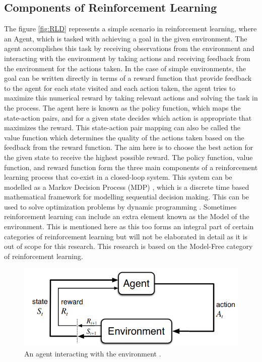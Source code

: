 \subsection{Components of Reinforcement Learning}

The figure \ref{fig:RLD} represents a simple scenario in reinforcement learning, where an Agent, which is tasked with achieving a goal in the given environment. The agent accomplishes this task by receiving observations from the environment and interacting with the environment by taking actions and receiving feedback from the environment for the actions taken. In the case of simple environments, the goal can be written directly in terms of a reward function that provide feedback to the agent for each state visited and each action taken, the agent tries to maximize this numerical reward by taking relevant actions and solving the task in the process. The agent here is known as the policy function, which maps the state-action pairs, and for a given state decides which action is appropriate that maximizes the reward. This state-action pair mapping can also be called the value function which determines the quality of the actions taken based on the feedback from the reward function. The aim here is to choose the best action for the given state to receive the highest possible reward. The policy function, value function, and reward function form the three main components of a reinforcement learning process that co-exist in a closed-loop system. This system can be modelled as a Markov Decision Process (MDP) \cite{Sutton1998} \cite{FMDP}, which is a discrete time based mathematical framework for modelling sequential decision making. This can be used to solve optimization problems by dynamic programming \cite{DPBE}. Sometimes reinforcement learning can include an extra element known as the Model of the environment. This is mentioned here as this too forms an integral part of certain categories of reinforcement learning but will not be elaborated in detail as it is out of scope for this research. This research is based on the Model-Free category of reinforcement learning. \\

\begin{figure}[h!]
    \centering
    \includegraphics[width=\textwidth]{images/HMM.png}
    \caption{An agent interacting with the environment \cite{Sutton1998}.}
    \label{fig:HMM}
\end{figure}

